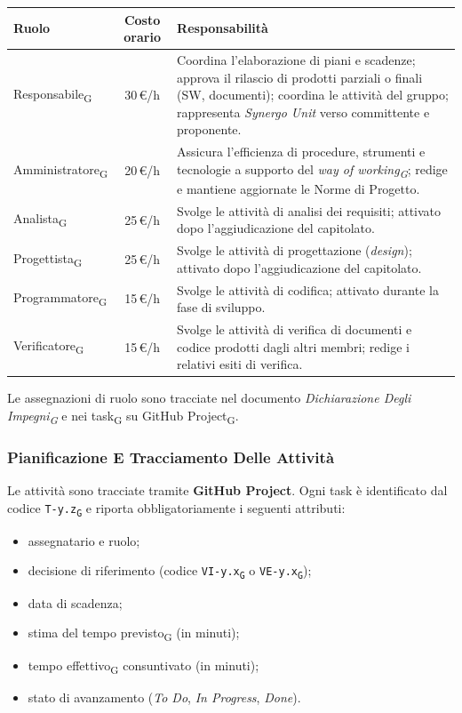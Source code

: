 \bigskip
\begin{tabularx}{\textwidth}{l c X}
  \toprule
  \textbf{Ruolo} & \textbf{Costo orario} & \textbf{Responsabilità} \\
  \midrule
  Responsabile\textsubscript{G}
    & 30\,€/h
    & Coordina l'elaborazione di piani e scadenze; approva il rilascio di
      prodotti parziali o finali (SW, documenti); coordina le attività del
      gruppo; rappresenta \textit{Synergo Unit} verso committente e
      proponente. \\[6pt]
  Amministratore\textsubscript{G}
    & 20\,€/h
    & Assicura l'efficienza di procedure, strumenti e tecnologie a supporto
      del \textit{way of working\textsubscript{G}}; redige e mantiene aggiornate le Norme di
      Progetto. \\[6pt]
  Analista\textsubscript{G}
    & 25\,€/h
    & Svolge le attività di analisi dei requisiti; attivato dopo
      l'aggiudicazione del capitolato. \\[6pt]
  Progettista\textsubscript{G}
    & 25\,€/h
    & Svolge le attività di progettazione (\textit{design}); attivato dopo
      l'aggiudicazione del capitolato. \\[6pt]
  Programmatore\textsubscript{G}
    & 15\,€/h
    & Svolge le attività di codifica; attivato durante la fase di sviluppo. \\[6pt]
  Verificatore\textsubscript{G}
    & 15\,€/h
    & Svolge le attività di verifica di documenti e codice prodotti dagli
      altri membri; redige i relativi esiti di verifica. \\
  \bottomrule
\end{tabularx}
 
\bigskip
Le assegnazioni di ruolo sono tracciate nel documento
\textit{Dichiarazione Degli Impegni\textsubscript{G}} e nei task\textsubscript{G} su
GitHub Project\textsubscript{G}.
 
\subsubsection{Pianificazione E Tracciamento Delle Attività}
 
Le attività sono tracciate tramite \textbf{GitHub Project}.
Ogni task è identificato dal codice \texttt{T-y.z\textsubscript{G}} e riporta
obbligatoriamente i seguenti attributi:
 
\begin{itemize}
  \item assegnatario e ruolo;
  \item decisione di riferimento (codice \texttt{VI-y.x\textsubscript{G}} o \texttt{VE-y.x\textsubscript{G}});
  \item data di scadenza;
  \item stima del tempo previsto\textsubscript{G} (in minuti);
  \item tempo effettivo\textsubscript{G} consuntivato (in minuti);
  \item stato di avanzamento (\textit{To Do}, \textit{In Progress},
        \textit{Done}).
\end{itemize}
 
